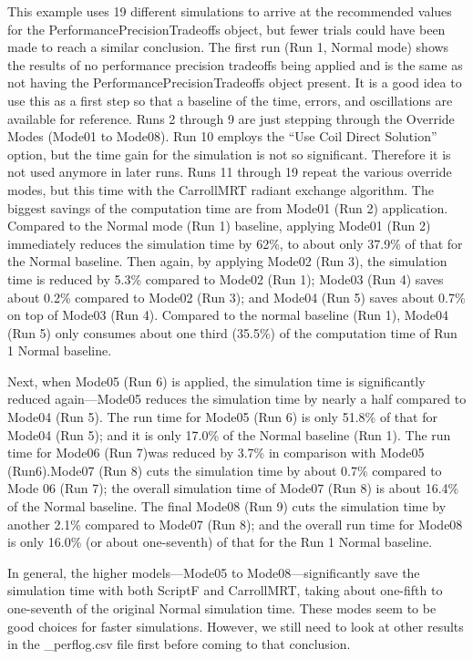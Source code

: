 This example uses 19 different simulations to arrive at the recommended values for the PerformancePrecisionTradeoffs object, but fewer trials could have been made to reach a similar conclusion. The first run (Run 1, Normal mode) shows the results of no performance precision tradeoffs being applied and is the same as not having the PerformancePrecisionTradeoffs object present. It is a good idea to use this as a first step so that a baseline of the time, errors, and oscillations are available for reference. Runs 2 through 9 are just stepping through the Override Modes (Mode01 to Mode08). Run 10 employs the ``Use Coil Direct Solution'' option, but the time gain for the simulation is not so significant. Therefore it is not used anymore in later runs. Runs 11 through 19 repeat the various override modes, but this time with the CarrollMRT radiant exchange algorithm. The biggest savings of the computation time are from Mode01 (Run 2) application. Compared to the Normal mode (Run 1) baseline, applying Mode01 (Run 2) immediately reduces the simulation time by 62\%, to about only 37.9\% of that for the Normal baseline. Then again, by applying Mode02 (Run 3), the simulation time is reduced by 5.3\% compared to Mode02 (Run 1); Mode03 (Run 4) saves about 0.2\% compared to Mode02 (Run 3); and Mode04 (Run 5) saves about 0.7\% on top of Mode03 (Run 4). Compared to the normal baseline (Run 1), Mode04 (Run 5) only consumes about one third (35.5\%) of the computation time of Run 1 Normal baseline.

Next, when Mode05 (Run 6) is applied, the simulation time is significantly reduced again---Mode05 reduces the simulation time by nearly a half compared to Mode04 (Run 5). The run time for Mode05 (Run 6) is only 51.8\% of that for Mode04 (Run 5); and it is only 17.0\% of the Normal baseline (Run 1). The run time for Mode06 (Run 7)was reduced by 3.7\% in comparison with Mode05 (Run6).Mode07 (Run 8) cuts the simulation time by about 0.7\% compared to Mode 06 (Run 7); the overall simulation time of Mode07 (Run 8) is about 16.4\% of the Normal baseline. The final Mode08 (Run 9) cuts the simulation time by another 2.1\% compared to Mode07 (Run 8); and the overall run time for Mode08 is only 16.0\% (or about one-seventh) of that for the Run 1 Normal baseline.

In general, the higher models---Mode05 to Mode08---significantly save the simulation time with both ScriptF and CarrollMRT, taking about one-fifth to one-seventh of the original Normal simulation time. These modes seem to be good choices for faster simulations. However, we still need to look at other results in the \_perflog.csv file first before coming to that conclusion.

